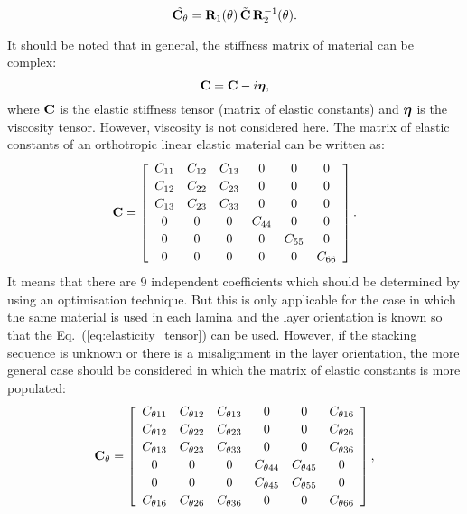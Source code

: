 \begin{equation}
\tilde{ \mathbf{C}_{\theta}}= \mathbf{R}_1(\theta) \,\tilde{\mathbf{C}} \,\mathbf{R}_2^{-1}(\theta).
\label{eq:elasticity_tensor}\end{equation}

It should be noted that in general, the stiffness matrix of material can be complex:
\begin{equation}
\tilde{\mathbf{C}}= \mathbf{C} - i \boldsymbol{\eta},
\label{eq:complex_elasticity_tensor}\end{equation}
 where \(\mathbf{C} \) is the elastic stiffness tensor (matrix of elastic constants) and \(\boldsymbol{\eta}\) is the viscosity tensor. 
	However, viscosity is not considered here. 
	The matrix of elastic constants of an orthotropic linear elastic material can be written as:
\begin{equation}
\mathbf{C} = \left[\begin{array}{cccccc} C_{11} & C_{12}& C_{13} & 0&0&0\\[2pt]
C_{12}& C_{22} & C_{23}& 0&0&0\\[2pt]
C_{13}&C_{23}&C_{33}&0&0&0\\[2pt]
0& 0 &0&C_{44}& 0&0\\[2pt]
0&0&0&0&C_{55}&0\\[2pt]
0&0&0&0&0&C_{66}
\end{array}\right]. 
\label{eq:elastic_constatns}\end{equation}
	It means that there are 9 independent coefficients which should be determined by using an optimisation technique. 
	But this is only applicable for the case in which the same material is used in each lamina and the layer orientation is known so that the Eq.~(\ref{eq:elasticity_tensor}) can be used. 
	However, if the stacking sequence is unknown or there is a misalignment in the layer orientation, the more general case should be considered in which the matrix of elastic constants is more populated:
\begin{equation}
\mathbf{C}_{\theta} = \left[\begin{array}{cccccc} C_{\theta 11} & C_{\theta 12}& C_{\theta 13} & 0&0&C_{\theta 16}\\[2pt]
C_{\theta 12}& C_{\theta 22} & C_{\theta 23}& 0 &0&C_{\theta 26}\\[2pt]
C_{\theta 13}&C_{\theta 23}&C_{\theta 33}&0&0&C_{\theta 36}\\[2pt]
0& 0&0&C_{\theta 44}& C_{\theta 45}&0\\[2pt]
0&0&0&C_{\theta 45}&C_{\theta 55}&0\\[2pt]
C_{\theta 16}&C_{\theta 26} &C_{\theta 36}&0&0&C_{\theta 66}
\end{array}\right], 
\label{eq:elastic_constatns_theta}\end{equation}

